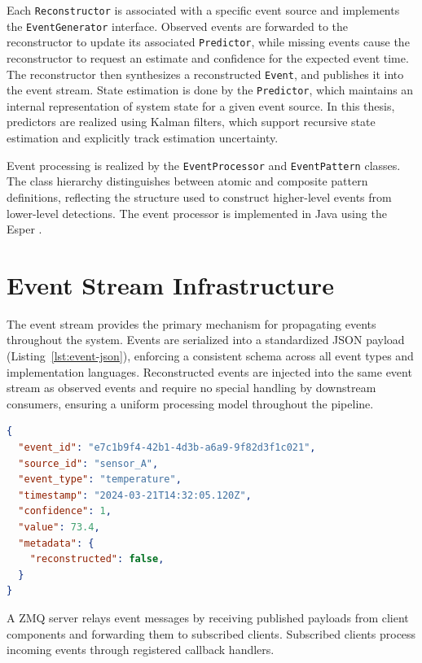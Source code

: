 Each \texttt{Reconstructor} is associated with a specific event source and implements the \texttt{EventGenerator} interface. Observed events are forwarded to the reconstructor to update its associated \texttt{Predictor}, while missing events cause the reconstructor to request an estimate and confidence for the expected event time. The reconstructor then synthesizes a reconstructed \texttt{Event}, and publishes it into the event stream. State estimation is done by the \texttt{Predictor}, which maintains an internal representation of system state for a given event source. In this thesis, predictors are realized using Kalman filters, which support recursive state estimation and explicitly track estimation uncertainty.

Event processing is realized by the \texttt{EventProcessor} and \texttt{EventPattern} classes. The class hierarchy distinguishes between atomic and composite pattern definitions, reflecting the structure used to construct higher-level events from lower-level detections. The event processor is implemented in Java using the Esper \cite{esper_reference}.



\section{Event Stream Infrastructure}
The event stream provides the primary mechanism for propagating events throughout the system. Events are serialized into a standardized JSON payload (Listing~\ref{lst:event-json}), enforcing a consistent schema across all event types and implementation languages. Reconstructed events are injected into the same event stream as observed events and require no special handling by downstream consumers, ensuring a uniform processing model throughout the pipeline.

\begin{lstlisting}[language=json, caption={Example standardized event payload}, label={lst:event-json}]
{
  "event_id": "e7c1b9f4-42b1-4d3b-a6a9-9f82d3f1c021",
  "source_id": "sensor_A",
  "event_type": "temperature",
  "timestamp": "2024-03-21T14:32:05.120Z",
  "confidence": 1,
  "value": 73.4,
  "metadata": {
    "reconstructed": false,
  }
}
\end{lstlisting}

A ZMQ server relays event messages by receiving published payloads from client components and forwarding them to subscribed clients.
Subscribed clients process incoming events through registered callback handlers.

